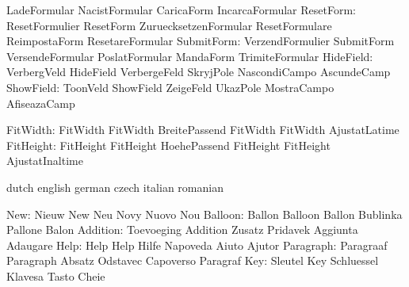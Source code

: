                            LadeFormular              NacistFormular
                           CaricaForm                IncarcaFormular
                ResetForm: ResetFormulier            ResetForm
                           ZuruecksetzenFormular     ResetFormulare
                           ReimpostaForm             ResetareFormular
               SubmitForm: VerzendFormulier          SubmitForm
                           VersendeFormular          PoslatFormular
                           MandaForm                 TrimiteFormular
                HideField: VerbergVeld               HideField
                           VerbergeFeld              SkryjPole
                           NascondiCampo             AscundeCamp
                ShowField: ToonVeld                  ShowField
                           ZeigeFeld                 UkazPole
                           MostraCampo               AfiseazaCamp

                 FitWidth: FitWidth                  FitWidth
                           BreitePassend             FitWidth
                           FitWidth                  AjustatLatime
                FitHeight: FitHeight                 FitHeight
                           HoehePassend              FitHeight
                           FitHeight                 AjustatInaltime

\stopvariables


\startvariables            dutch                     english
                           german                    czech
                           italian                   romanian

                      New: Nieuw                     New
                           Neu                       Novy
                           Nuovo                     Nou
                  Balloon: Ballon                    Balloon
                           Ballon                    Bublinka
                           Pallone                   Balon
                 Addition: Toevoeging                Addition
                           Zusatz                    Pridavek
                           Aggiunta                  Adaugare
                     Help: Help                      Help
                           Hilfe                     Napoveda
                           Aiuto                     Ajutor
                Paragraph: Paragraaf                 Paragraph
                           Absatz                    Odstavec
                           Capoverso                 Paragraf
                      Key: Sleutel                   Key
                           Schluessel                Klavesa
                           Tasto                     Cheie
\stopvariables

